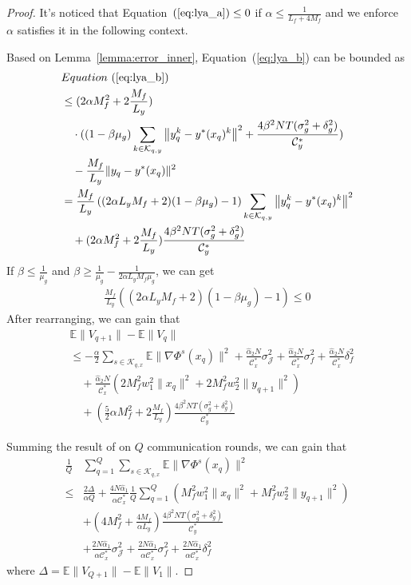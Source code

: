 \documentclass[lettersize,journal]{IEEEtran}
\begin{document}
\begin{proof}
It's noticed that Equation~$(\ref{eq:lya_a})\leq 0$ if $\alpha\leq\frac{1}{L_f+4M_f}$ and we enforce $\alpha$ satisfies it in the following context.

Based on Lemma~\ref{lemma:error_inner}, Equation~(\ref{eq:lya_b}) can be bounded as
\begin{align*}
    &Equation~(\ref{eq:lya_b})\nonumber\\&\leq(2\alpha M_f^2+2\frac{M_f}{L_y})\\&\quad\cdot((1-\beta\mu_g)\sum_{k\in \mathcal{K}_{q,y}}\left\|y_{q}^k-y^*(x_q)^k\right\|^2 +\frac{4\beta^2NT(\sigma_{g}^2+\delta_{g}^2)}{\mathcal{C}^{*}_{y}})\\&\quad-\frac{M_f}{L_y}\|y_q-y^*(x_q)\|^2
    \nonumber
    \\
    &= \frac{M_f}{L_y}\left((2\alpha L_y M_f+2)(1-\beta \mu_g)-1\right)\sum_{k\in \mathcal{K}_{q,y}}\left\|y_{q}^k-y^*(x_q)^k\right\|^2\\&\quad+(2\alpha M_f^2+2\frac{M_f}{L_y})\frac{4\beta^2NT(\sigma_{g}^2+\delta_{g}^2)}{\mathcal{C}^{*}_{y}}
    \nonumber
\end{align*}
If $\beta\leq\frac{1}{\mu_g}$ and $\beta \geq \frac{1}{\mu_g}-\frac{1}{2\alpha L_yM_f\mu_g}$, we can get  
\begin{align*}
\frac{M_f}{L_y}\left((2\alpha L_y M_f+2)(1-\beta \mu_g)-1\right)\leq0
\end{align*}
After rearranging, we can gain that
\begin{align*}
    &\mathbb{E}\| V_{q+1}\|-\mathbb{E}\|V_{q} \|
    \\& \leq-\frac{\alpha}{2}\sum_{s\in \mathcal{K}_{q,x}}\mathbb{E}\|\nabla \Phi^s(x_{q})\|^2+\frac{\hat{\alpha}_2N}{\mathcal{C}_x^*}\sigma_{\mathcal{J}}^2+\frac{\hat{\alpha}_2N}{\mathcal{C}_x^*}\sigma_f^2+\frac{\hat{\alpha}_2N}{\mathcal{C}_x^*}\delta^2_f\\
    &\quad+\frac{\hat{\alpha}_2N}{\mathcal{C}_x^*}(2M_f^2 w_1^2 \|x_q\|^2+2M_f^2 w_2^2 \|y_{q+1}\|^2)\\
    &\quad+(\frac{5}{2}\alpha M_f^2+2\frac{M_f}{L_y})\frac{4\beta^2NT(\sigma_{g}^2+\delta_{g}^2)}{\mathcal{C}^{*}_{y}}
\end{align*}

Summing the result of on $Q$ communication rounds, we can gain that
\begin{align*}
     \frac{1}{Q}&\sum_{q=1}^Q\sum_{s\in \mathcal{K}_{q,x}}\mathbb{E}\|\nabla \Phi^s(x_{q})\|^2\\\leq& \frac{2\Delta}{\alpha Q}+\frac{4N\hat{\alpha}_1}{\alpha\mathcal{C}_x^*}\frac{1}{Q}\sum_{q=1}^Q(M_f^2 w_1^2 \|x_q\|^2+M_f^2 w_2^2 \|y_{q+1}\|^2)\\&+(4M_f^2+\frac{4M_f}{\alpha L_y})\frac{4\beta^2NT(\sigma_{g}^2+\delta_{g}^2)}{\mathcal{C}^{*}_{y}}\\
     &+\frac{2N\hat{\alpha}_1}{\alpha\mathcal{C}_x^*}\sigma_{\mathcal{J}}^2+\frac{2N\hat{\alpha}_1}{\alpha\mathcal{C}_x^*}\sigma_f^2+\frac{2N\hat{\alpha}_1}{\alpha\mathcal{C}_x^*}\delta^2_f
\end{align*}
where $\Delta=\mathbb{E}\|V_{Q+1}\|-\mathbb{E}\| V_{1}\|$.


\end{proof}
\end{document}
